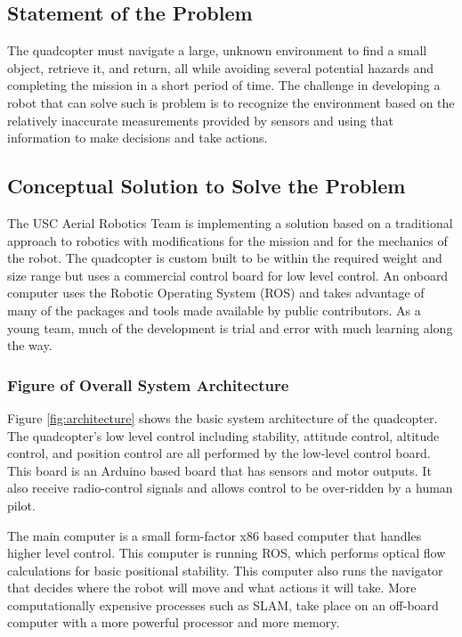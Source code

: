\documentclass[12pt, letterpaper]{article}
\begin{document}
\subsection{Statement of the Problem}
The quadcopter must navigate a large, unknown environment to find a small object, retrieve it, and return, all while avoiding several potential hazards and completing the mission in a short period of time. The challenge in developing a robot that can solve such is problem is to recognize the environment based on the relatively inaccurate measurements provided by sensors and using that information to make decisions and take actions. 

\subsection{Conceptual Solution to Solve the Problem}
The USC Aerial Robotics Team is implementing a solution based on a traditional approach to robotics with modifications for the mission and for the mechanics of the robot. The quadcopter is custom built to be within the required weight and size range but uses a commercial control board for low level control. An onboard computer uses the Robotic Operating System (ROS) and takes advantage of many of the packages and tools made available by public contributors. As a young team, much of the development is trial and error with much learning along the way.

\subsubsection{Figure of Overall System Architecture}

Figure \eqref{fig:architecture} shows the basic system architecture of the quadcopter. The quadcopter's low level control including stability, attitude control, altitude control, and position control are all performed by the low-level control board. This board is an Arduino based board that has sensors and motor outputs. It also receive radio-control signals and allows control to be over-ridden by a human pilot.

The main computer is a small form-factor x86 based computer that handles higher level control. This computer is running ROS, which performs optical flow calculations for basic positional stability. This computer also runs the navigator that decides where the robot will move and what actions it will take. More computationally expensive processes such as SLAM, take place on an off-board computer with a more powerful processor and more memory.
\end{document}
